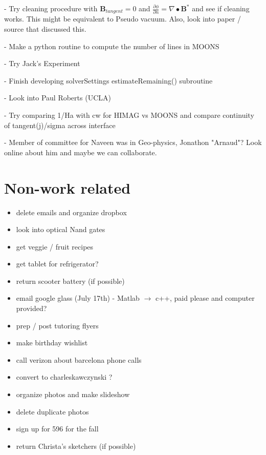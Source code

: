 \documentclass[11pt]{article}
\begin{document}
- Try cleaning procedure with $\mathbf{B}_{tangent}=0$ and $\frac{\partial \phi}{\partial n} = \nabla \bullet \mathbf{B}^*$ and see if cleaning works. This might be equivalent to Pseudo vacuum. Also, look into paper / source that discussed this.

- Make a python routine to compute the number of lines in MOONS

- Try Jack's Experiment

- Finish developing solverSettings estimateRemaining() subroutine

- Look into Paul Roberts (UCLA)

- Try comparing 1/Ha with cw for HIMAG vs MOONS and compare continuity of tangent(j)/sigma across interface

- Member of committee for Naveen was in Geo-physics, Jonathon "Arnaud"? Look online about him and maybe we can collaborate.

\newpage
\section{Non-work related}
\begin{itemize}
\setlength\itemsep{-1em}
\item delete emails and organize dropbox
\item look into optical Nand gates
\item get veggie / fruit recipes
\item get tablet for refrigerator?
\item return scooter battery (if possible)
\item email google glass (July 17th) - Matlab $\rightarrow$ c++, paid please and computer provided?
\item prep / post tutoring flyers
\item make birthday wishlist
\item call verizon about barcelona phone calls
\item convert to charleskawczynski ?
\item organize photos and make slideshow
\item delete duplicate photos
\item sign up for 596 for the fall
\item return Christa's sketchers (if possible)
\end{itemize}
\end{document}
